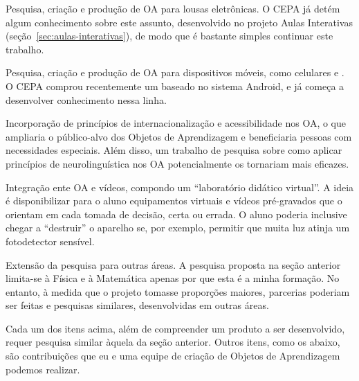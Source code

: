 \begin{compactitem}
	\item Pesquisa, criação e produção de OA para lousas eletrônicas. O CEPA já detém algum conhecimento sobre este assunto, desenvolvido no projeto Aulas Interativas (seção~\ref{sec:aulas-interativas}), de modo que é bastante simples continuar este trabalho.
	\item Pesquisa, criação e produção de OA para dispositivos móveis, como celulares e . O CEPA comprou recentemente um  baseado no sistema Android, e já começa a desenvolver conhecimento nessa linha.
	\item Incorporação de princípios de internacionalização e acessibilidade nos OA, o que ampliaria o público-alvo dos Objetos de Aprendizagem e beneficiaria pessoas com necessidades especiais. Além disso, um trabalho de pesquisa sobre como aplicar princípios de neurolinguística nos OA potencialmente os tornariam mais eficazes.
	\item Integração ente OA e vídeos, compondo um ``laboratório didático virtual''. A ideia é disponibilizar para o aluno equipamentos virtuais e vídeos pré-gravados que o orientam em cada tomada de decisão, certa ou errada. O aluno poderia inclusive chegar a ``destruir'' o aparelho se, por exemplo, permitir que muita luz atinja um fotodetector sensível.
	\item Extensão da pesquisa para outras áreas. A pesquisa proposta na seção anterior limita-se à Física e à Matemática apenas por que esta é a minha formação. No entanto, à medida que o projeto tomasse proporções maiores, parcerias poderiam ser feitas e pesquisas similares, desenvolvidas em outras áreas.
\end{compactitem}

Cada um dos itens acima, além de compreender um produto a ser desenvolvido, requer pesquisa similar àquela da seção anterior. Outros itens, como os abaixo, são contribuições que eu e uma equipe de criação de Objetos de Aprendizagem podemos realizar.

